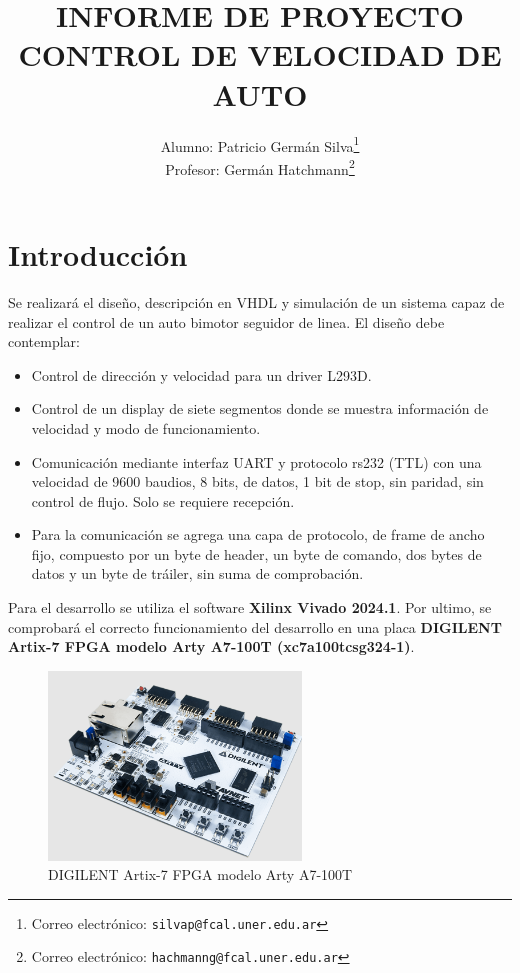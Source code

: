 \documentclass[12pt]{article}
\title{\textbf{INFORME DE PROYECTO} \\ \textbf{CONTROL DE VELOCIDAD DE AUTO}}
\author{Alumno: Patricio Germán Silva\thanks{Correo electrónico: \texttt{silvap@fcal.uner.edu.ar}} \\ Profesor: Germán Hatchmann\thanks{Correo electrónico: \texttt{hachmanng@fcal.uner.edu.ar}}}
\affil{\textbf{Introducción a VHDL}  \\ \textbf{Ingeniería en Mecatrónica}}
\begin{document}
\maketitle



\thispagestyle{empty}
\newpage
\tableofcontents
\thispagestyle{empty}
\newpage
{}




\section{Introducción}

Se realizará el diseño, descripción en VHDL y simulación de un sistema capaz de realizar el control de un auto bimotor seguidor de linea. El diseño debe contemplar:
\begin{itemize}
\item Control de dirección y velocidad para un driver L293D.
\item Control de un display de siete segmentos donde se muestra información de velocidad y modo de funcionamiento.
\item Comunicación mediante interfaz UART y protocolo rs232 (TTL) con una velocidad de 9600 baudios, 8 bits, de datos, 1 bit de stop, sin paridad, sin control de flujo. Solo se requiere recepción.
\item Para la comunicación se agrega una capa de protocolo, de frame de ancho fijo, compuesto por un byte de header, un byte de comando, dos bytes de datos y un byte de tráiler, sin suma de comprobación.
\end{itemize}

Para el desarrollo se utiliza el software \textbf{Xilinx Vivado 2024.1}. Por ultimo, se comprobará el correcto funcionamiento del desarrollo en una placa \textbf{DIGILENT Artix-7 FPGA modelo Arty A7-100T (xc7a100tcsg324-1)}. 

\begin{figure}[H]
    \centering
    \includegraphics[width=0.6\textwidth]{digilent-arty}
    \caption{DIGILENT  Artix-7 FPGA modelo Arty A7-100T}
\end{figure}
\end{document}

